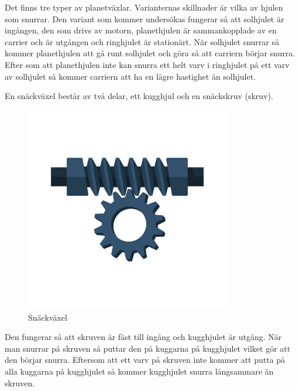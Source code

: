 \documentclass[11p]{article}
\begin{document}
Det finns tre typer av planetväxlar.
Varianternas skillnader är vilka av hjulen som snurrar.
Den variant som kommer undersökas fungerar så att solhjulet är ingången, den som drivs av motorn, planethjulen är sammankopplade av en carrier och är utgången och ringhjulet är stationärt.
När solhjulet snurrar så kommer planethjulen att gå runt solhjulet och göra så att carriern börjar snurra.
Efter som att planethjulen inte kan snurra ett helt varv i ringhjulet på ett varv av solhjulet så kommer carriern att ha en lägre hastighet än solhjulet.

En snäckväxel består av två delar, ett kugghjul och en snäckskruv (skruv).
\begin{figure}[!h]
    \includegraphics[width=0.8\textwidth]{snäckväxel.jpg}
    \caption{Snäckväxel}
    \label{fig:snäck}
\end{figure}

Den fungerar så att skruven är fäst till ingång och kugghjulet är utgång.
När man snurrar på skruven så puttar den på kuggarna på kugghjulet vilket gör att den börjar snurra.
Eftersom att ett varv på skruven inte kommer att putta på alla kuggarna på kugghjulet så kommer kugghjulet snurra långsammare än skruven.
\end{document}
